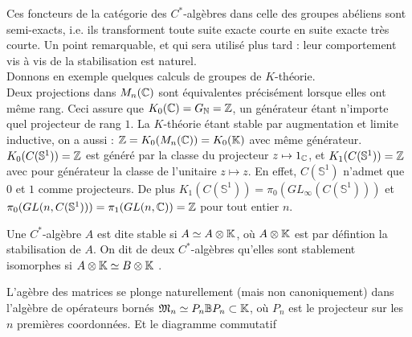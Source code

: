 Ces foncteurs de la catégorie des $C^*$-algèbres dans celle des groupes abéliens sont semi-exacts, i.e. ils transforment toute suite exacte courte en suite exacte très courte. Un point remarquable, et qui sera utilisé plus tard : leur comportement vis à vis de la stabilisation est naturel.\\

Donnons en exemple quelques calculs de groupes de $K$-théorie. \\

Deux projections dans $M_n(\mathbb C)$ sont équivalentes précisément lorsque elles ont même rang. Ceci assure que $K_0(\mathbb C)=G_{\mathbb N}=\mathbb Z$, un générateur étant n'importe quel projecteur de rang $1$. La $K$-théorie étant stable par augmentation et limite inductive, on a aussi : $\mathbb Z=K_0(M_n(\mathbb C))=K_0(\mathbb K)$ avec même générateur. \\

$K_0(C(\mathbb S^1))=\mathbb Z$ est généré par la classe du projecteur $z\mapsto 1_\mathbb C$, et $K_1(C(\mathbb S^1))=\mathbb Z$ avec pour générateur la classe de l'unitaire $z\mapsto  z$. En effet, $C(\mathbb S^1)$ n'admet que $0$ et $1$ comme projecteurs. De plus $K_1(C(\mathbb S^1))=\pi_0(GL_\infty(C(\mathbb S^1)))$ et $\pi_0(GL(n,C(\mathbb S^1) ))=\pi_1(GL(n,\mathbb C))=\mathbb Z$ pour tout entier $n$.\\

\begin{definition}
Une $C^*$-algèbre $A$ est dite stable si $A\simeq A\otimes \mathbb K$, où $A\otimes \mathbb K$ est par défintion la stabilisation de $A$. On dit de deux $C^*$-algèbres qu'elles sont stablement isomorphes si $A\otimes \mathbb K \simeq B\otimes \mathbb K$ .
\end{definition}

L'agèbre des matrices se plonge naturellement (mais non canoniquement) dans l'algèbre de opérateurs bornés $\mathfrak M_n \simeq P_n \mathbb B P_n \subset \mathbb K $, où $P_n$ est le projecteur sur les $n$ premières coordonnées. Et le diagramme commutatif 

